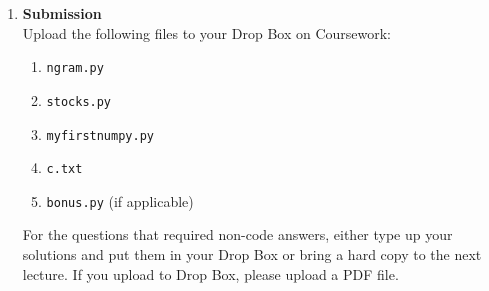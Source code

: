 \documentclass{article}
\newcounter{points}
\newcommand\printpoints{Total number of points: \value{\thepoints}}
\begin{document}
\begin{enumerate}
\item \textbf{Submission} \\
Upload the following files to your Drop Box on Coursework:
\begin{enumerate}
\item \texttt{ngram.py}
\item \texttt{stocks.py}
\item \texttt{myfirstnumpy.py}
\item \texttt{c.txt}
\item \texttt{bonus.py} (if applicable)
\end{enumerate}

For the questions that required non-code answers, either type up your solutions and put them in your Drop Box or bring a hard copy to the next lecture.  If you upload to Drop Box, please upload a PDF file.

\end{enumerate}
\end{document}
